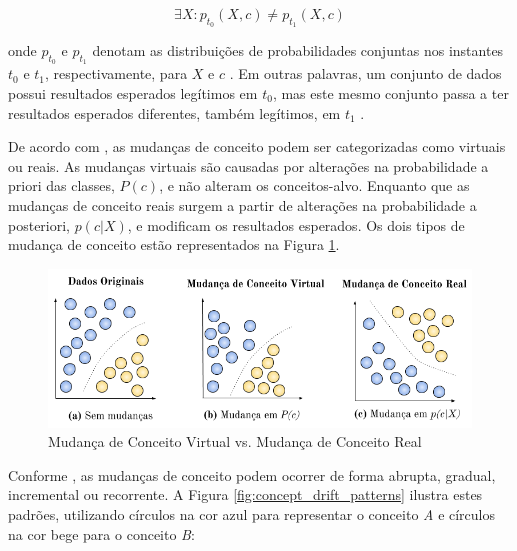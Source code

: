 \documentclass[msc, classic, a4paper]{ufbathesis}
\begin{document}
\begin{equation} \label{eq:3}
    {\exists}X : p_{t_0}(X, c) \ne p_{t_1}(X, c)
\end{equation}

onde $p_{t_0}$ e $p_{t_1}$ denotam as distribuições de probabilidades conjuntas nos instantes $t_0$ e $t_1$, respectivamente,
para $X$ e $c$ \cite{Gama:2014:SCD:2597757.2523813}.
Em outras palavras, um conjunto de dados possui resultados esperados legítimos em $t_0$, mas este mesmo conjunto passa a ter resultados esperados diferentes, também legítimos, em $t_1$ \cite{Kolter:2007:DWM:1314498.1390333}.

De acordo com , as mudanças de conceito podem ser categorizadas como virtuais ou reais.
As mudanças virtuais são causadas por alterações na probabilidade a priori das classes, $P(c)$, e não alteram os conceitos-alvo.
Enquanto que as mudanças de conceito reais surgem a partir de alterações na probabilidade a posteriori, $p(c|X)$, e modificam os resultados esperados.
Os dois tipos de mudança de conceito estão representados na Figura \ref{fig:real_and_virtual_concept_drift}.

\begin{figure}[H]
\begin{center}
    \includegraphics[scale=0.8]{imagens/concept_drift.png}
    \caption{Mudança de Conceito Virtual vs. Mudança de Conceito Real}
    \label{fig:real_and_virtual_concept_drift}
\end{center}
\end{figure}

Conforme , as mudanças de conceito podem ocorrer de forma abrupta, gradual, incremental ou recorrente.
A Figura \ref{fig:concept_drift_patterns} ilustra estes padrões,
utilizando círculos na cor azul para representar o conceito \textit{A} e círculos na cor bege para o conceito \textit{B}:
\end{document}
